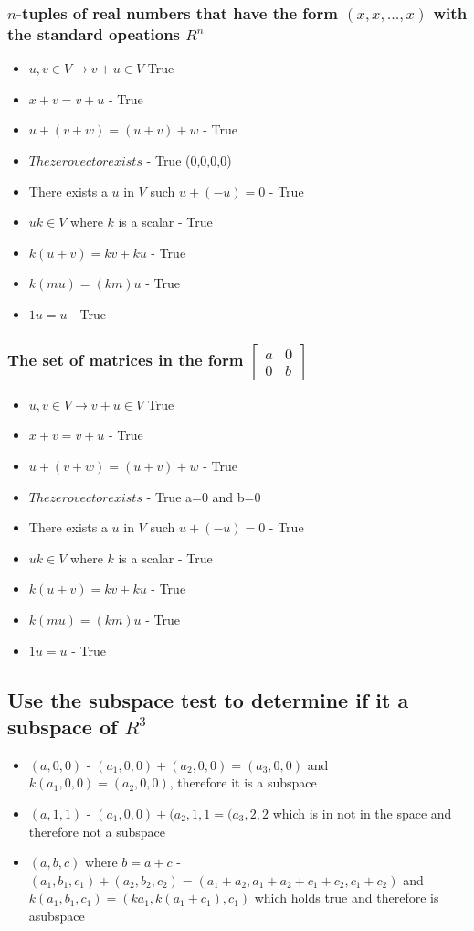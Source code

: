 \documentclass[12pt, a4paper]{article}
\begin{document}
			\subsubsection{$n$-tuples of real numbers that have the form $(x,x,...,x)$ with the standard opeations $R^n$}
				\begin{itemize}
					\item $u,v\in V \rightarrow v+u\in V$ True
					\item $x+v=v+u$ - True
					\item $u+(v+w)=(u+v)+w$ - True
					\item $The zero vector exists$ - True (0,0,0,0)
					\item There exists a $u$ in $V$ such $u+(-u)=0$ - True
					\item $uk\in V$ where $k$ is a scalar - True
					\item $k(u+v)=kv+ku$ - True
					\item $k(mu)=(km)u$ - True
					\item $1u=u$ - True
				\end{itemize}
			\subsubsection{The set of matrices in the form $\begin{bmatrix}
				a&0\\
				0 & b
					\end{bmatrix}$}
				\begin{itemize}
					\item $u,v\in V \rightarrow v+u\in V$ True
					\item $x+v=v+u$ - True
					\item $u+(v+w)=(u+v)+w$ - True
					\item $The zero vector exists$ - True a=0 and b=0
					\item There exists a $u$ in $V$ such $u+(-u)=0$ - True
					\item $uk\in V$ where $k$ is a scalar - True
					\item $k(u+v)=kv+ku$ - True
					\item $k(mu)=(km)u$ - True
					\item $1u=u$ - True
				\end{itemize}
		\subsection{Use the subspace test to determine if it a subspace of $R^3$}
			\begin{itemize}
				\item $(a,0,0)$ - $(a_1,0,0)+(a_2,0,0)=(a_3,0,0)$ and $k(a_1,0,0)=(a_2,0,0)$, therefore it is a subspace
				\item $(a,1,1)$ - $(a_1,0,0)+(a_2,1,1=(a_3,2,2$ which is in not in the space and therefore not a subspace
				\item $(a,b,c)$ where $b=a+c$ - $(a_1,b_1,c_1)+(a_2,b_2,c_2)=(a_1+a_2,a_1+a_2+c_1+c_2,c_1+c_2)$ and $k(a_1,b_1,c_1)=(ka_1,k(a_1+c_1),c_1)$ which holds true and therefore is asubspace
			\end{itemize}
\end{document}
